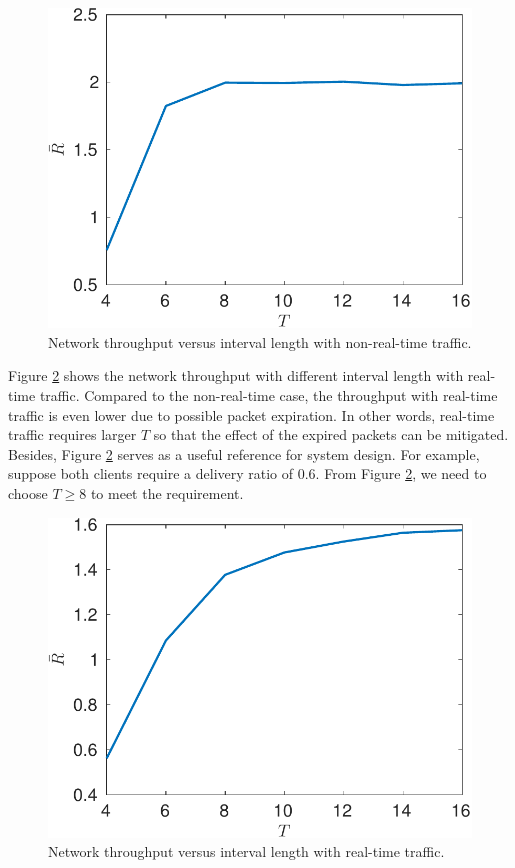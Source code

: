 \documentclass{article}
\begin{document}
\begin{figure}[htbp]
\centering
\includegraphics[scale=0.7]{nonrealtime_throughput_T.pdf}
\caption{Network throughput versus interval length with non-real-time traffic.}
\label{nonrealtime_throughput_T}
\end{figure}

Figure \ref{realtime_throughput_T} shows the network throughput with different interval length with real-time traffic. Compared to the non-real-time case, the throughput with real-time traffic is even lower due to possible packet expiration. In other words, real-time traffic requires larger $T$ so that the effect of the expired packets can be mitigated. Besides, Figure \ref{realtime_throughput_T} serves as a useful reference for system design. For example, suppose both clients require a delivery ratio of 0.6. From Figure \ref{realtime_throughput_T}, we need to choose $T\geq 8$ to meet the requirement. 

\begin{figure}[htbp]
\centering
\includegraphics[scale=0.7]{realtime_throughput_T.pdf}
\caption{Network throughput versus interval length with real-time traffic.}
\label{realtime_throughput_T}
\end{figure}
\end{document}
